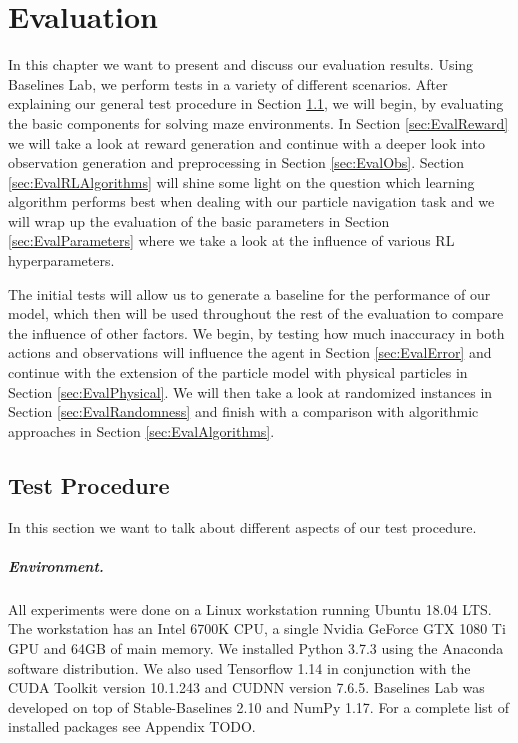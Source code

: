 \chapter{Evaluation} \label{chp:Evaluation}
In this chapter we want to present and discuss our evaluation results. Using Baselines Lab, we perform tests in a variety of different scenarios. After explaining our general test procedure in Section \ref{sec:TestProcedure}, we will begin, by evaluating the basic components for solving maze environments. In Section \ref{sec:EvalReward} we will take a look at reward generation and continue with a deeper look into observation generation and preprocessing in Section \ref{sec:EvalObs}. Section \ref{sec:EvalRLAlgorithms} will shine some light on the question which learning algorithm performs best when dealing with our particle navigation task and we will wrap up the evaluation of the basic parameters in Section \ref{sec:EvalParameters} where we take a look at the influence of various RL hyperparameters.

The initial tests will allow us to generate a baseline for the performance of our model, which then will be used throughout the rest of the evaluation to compare the influence of other factors. We begin, by testing how much inaccuracy in both actions and observations will influence the agent in Section \ref{sec:EvalError} and continue with the extension of the particle model with physical particles in Section \ref{sec:EvalPhysical}. We will then take a look at randomized instances in Section \ref{sec:EvalRandomness} and finish with a comparison with algorithmic approaches in Section \ref{sec:EvalAlgorithms}.


\section{Test Procedure} \label{sec:TestProcedure}
In this section we want to talk about different aspects of our test procedure.

\paragraph{Environment.}
All experiments were done on a Linux workstation running Ubuntu 18.04 LTS. The workstation has an Intel 6700K CPU, a single Nvidia GeForce GTX 1080 Ti GPU and 64GB of main memory. We installed Python 3.7.3 using the Anaconda \cite{anaconda} software distribution. We also used Tensorflow 1.14 in conjunction with the CUDA Toolkit version 10.1.243 and CUDNN version 7.6.5. Baselines Lab was developed on top of Stable-Baselines 2.10 and NumPy 1.17. For a complete list of installed packages see Appendix TODO.


